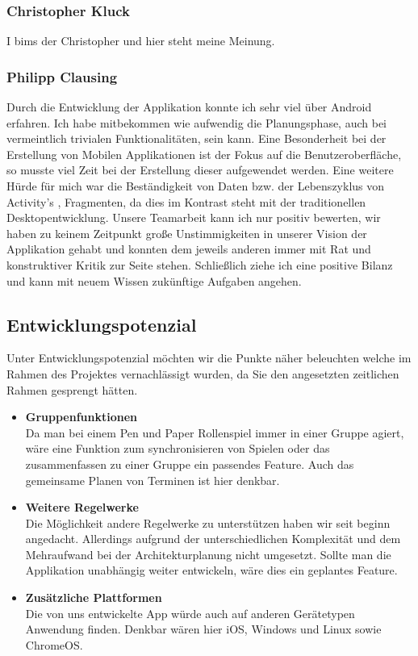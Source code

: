 \subsubsection{Christopher Kluck}
I bims der Christopher und hier steht meine Meinung.
\subsubsection{Philipp Clausing}
Durch die Entwicklung der Applikation konnte ich sehr viel über Android erfahren. Ich habe mitbekommen wie aufwendig die Planungsphase, auch bei vermeintlich trivialen Funktionalitäten, sein kann. Eine Besonderheit bei der Erstellung von Mobilen Applikationen ist der Fokus auf die Benutzeroberfläche, so musste viel Zeit bei der Erstellung dieser aufgewendet werden. Eine weitere Hürde für mich war die \grqq Beständigkeit\grqq{} von Daten bzw. der Lebenszyklus von Activity's , Fragmenten, da dies im Kontrast steht mit der traditionellen Desktopentwicklung. Unsere Teamarbeit kann ich nur positiv bewerten, wir haben zu keinem Zeitpunkt große Unstimmigkeiten in unserer Vision der Applikation gehabt und konnten dem jeweils anderen immer mit Rat und konstruktiver Kritik zur Seite stehen. Schließlich ziehe ich eine positive Bilanz und kann mit neuem Wissen zukünftige Aufgaben angehen.

\subsection{Entwicklungspotenzial}
Unter Entwicklungspotenzial möchten wir die Punkte näher beleuchten welche im Rahmen des Projektes vernachlässigt wurden, da Sie den angesetzten zeitlichen Rahmen gesprengt hätten.\\
\begin{itemize}
	\item \textbf{Gruppenfunktionen}\\
	Da man bei einem Pen und Paper Rollenspiel immer in einer Gruppe agiert, wäre eine Funktion zum synchronisieren von Spielen oder das zusammenfassen zu einer Gruppe ein passendes Feature. Auch das gemeinsame Planen von Terminen ist hier denkbar.
	\item \textbf{Weitere Regelwerke}\\
	Die Möglichkeit andere Regelwerke zu unterstützen haben wir seit beginn angedacht. Allerdings aufgrund der unterschiedlichen Komplexität und dem Mehraufwand bei der Architekturplanung nicht umgesetzt. Sollte man die Applikation unabhängig weiter entwickeln, wäre dies ein geplantes Feature.
	\item \textbf{Zusätzliche Plattformen}\\
	Die von uns entwickelte App würde auch auf anderen Gerätetypen Anwendung finden. Denkbar wären hier iOS, Windows und Linux sowie ChromeOS.
\end{itemize}

